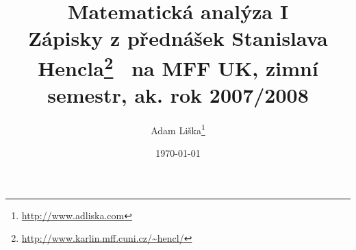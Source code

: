 \documentclass[12pt]{article}
\theoremstyle{definition}
\begin{document}
\title{Matematická analýza I \\ 
    \vspace{1 mm} {\normalsize Zápisky z přednášek Stanislava 
        Hencla\footnote{\url{http://www.karlin.mff.cuni.cz/~hencl/}} \ 
        na MFF UK, zimní semestr, ak. rok 2007/2008}}

\author{Adam Li\v{s}ka\footnote{\url{http://www.adliska.com}}}

\date{\today}

\maketitle

\newpage
\tableofcontents





\end{document}
